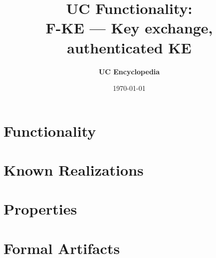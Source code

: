 \documentclass[11pt,a4paper]{article}
\title{\textbf{\Large UC Functionality:}\\[0.2em] \Large F-KE --- Key exchange, authenticated KE}
\author{\textbf{UC Encyclopedia}}
\date{\today}
\newtheorem{functionality}{Functionality}
\begin{document}
\maketitle

\begin{abstract}
\end{abstract}

\section{Functionality}

%

\section{Known Realizations}


\section{Properties}


\section{Formal Artifacts}

\end{document}
